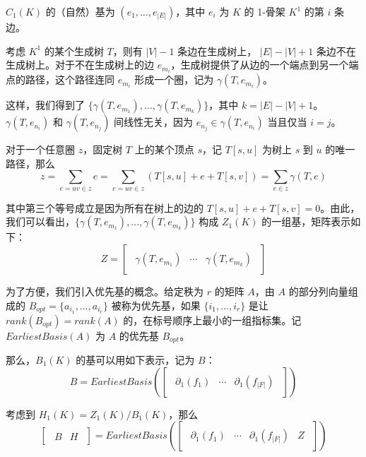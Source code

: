 $ C_1(K) $ 的（自然）基为 $ (e_1, \dots, e_{|E|}) $，其中 $ e_i $ 为 $ K $ 的 1-骨架 $ K^1 $ 的第 $ i $ 条边。

考虑 $ K^1 $ 的某个生成树 $ T $，则有 $ |V| - 1 $ 条边在生成树上， $ |E| - |V| + 1 $ 条边不在生成树上。对于不在生成树上的边 $ e_{m_i} $，生成树提供了从边的一个端点到另一个端点的路径，这个路径连同 $ e_{m_i} $ 形成一个圈，记为 $ \gamma(T, e_{m_i}) $。

这样，我们得到了 $ \{ \gamma(T, e_{m_1}), \dots, \gamma(T, e_{m_{k}}) \} $，其中 $ k = |E| - |V| + 1 $。$ \gamma(T, e_{n_i}) $ 和 $ \gamma(T, e_{n_j}) $ 间线性无关，因为 $ e_{n_j} \in \gamma(T, e_{n_i}) $ 当且仅当 $ i = j $。

对于一个任意圈 $ z $，固定树 $ T $ 上的某个顶点 $ s $，记 $ T[s, u] $ 为树上 $ s $ 到 $ u $ 的唯一路径，那么
$$
z = \sum_{e=uv \in z} e = \sum_{e=uv \in z} (T[s, u] + e + T[s, v]) = \sum_{e \in z} \gamma(T, e)
$$

其中第三个等号成立是因为所有在树上的边的 $ T[s, u] + e + T[s, v] = 0 $。由此，我们可以看出，$ \{ \gamma(T, e_{m_1}), \dots, \gamma(T, e_{m_{k}}) \} $ 构成 $ Z_1(K) $ 的一组基，矩阵表示如下：
$$
Z = 
\begin{bmatrix}
\begin{array}{c|c|c}
    \gamma(T, e_{m_1}) & \cdots & \gamma(T, e_{m_{k}})
\end{array}
\end{bmatrix}
$$

为了方便，我们引入优先基的概念。给定秩为 $ r $ 的矩阵 $ A $，由 $ A $ 的部分列向量组成的 $ B_{opt} = \{a_{i_1}, \dots, a_{i_r}\} $ 被称为优先基，如果 $ \{ i_1, \dots, i_r \} $ 是让 $ rank(B_{opt}) = rank(A) $ 的，在标号顺序上最小的一组指标集。记 $ EarliestBasis(A) $ 为 $ A $ 的优先基 $ B_{opt} $。

那么，$ B_1(K) $ 的基可以用如下表示，记为 $ B $：
$$
B = 
EarliestBasis(\begin{bmatrix}
    \begin{array}{c|c|c}
    \partial_1(f_1) & \cdots & \partial_1(f_{|F|})
\end{array}
\end{bmatrix})
$$

考虑到 $ H_1(K) = Z_1(K) / B_1(K) $，那么
$$
\begin{bmatrix}
    \begin{array}{c|c}
        B & H
    \end{array}
\end{bmatrix} =
EarliestBasis(\begin{bmatrix}
    \begin{array}{ccc|c}
        \partial_1(f_1) & \cdots & \partial_1(f_{|F|}) & Z
    \end{array}
\end{bmatrix})
$$

